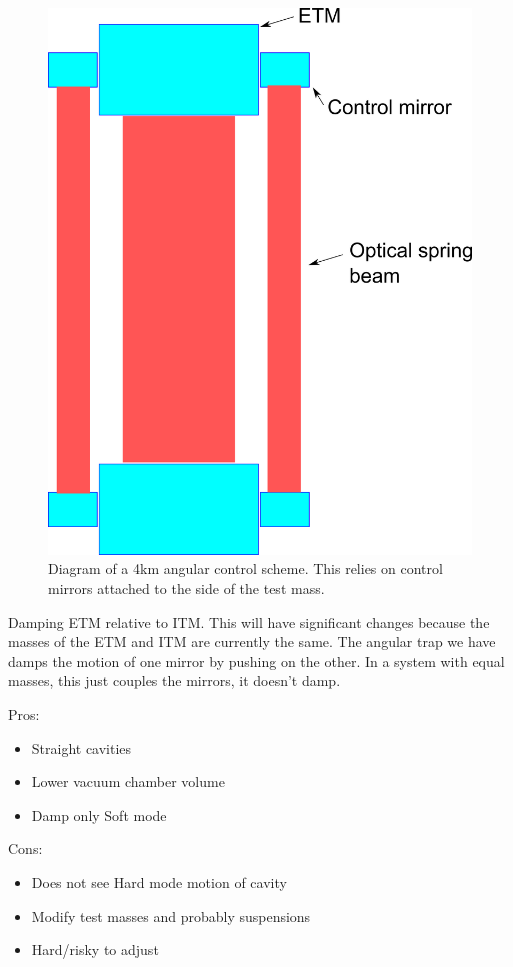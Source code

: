 \begin{figure}[htp]%
\begin{center}
\includegraphics[width=.8\textwidth]{figures/application/longTrapDiagram}%
\caption[4 km angular control]{Diagram of a 4km angular control scheme. This relies on control mirrors attached to the side of the test mass.}%
\label{fig:longtrapdiagram}%
\end{center}
\end{figure}

Damping ETM relative to ITM. This will have significant changes because the masses of the ETM and ITM are currently the same. The angular trap we have damps the motion of one mirror by pushing on the other. In a system with equal masses, this just couples the mirrors, it doesn't damp. 

Pros:

\begin{itemize}
	\item Straight cavities
	\item Lower vacuum chamber volume
	\item Damp only Soft mode
\end{itemize}

Cons:
\begin{itemize}
	\item Does not see Hard mode motion of cavity
	\item Modify test masses and probably suspensions
	\item Hard/risky to adjust
\end{itemize}


